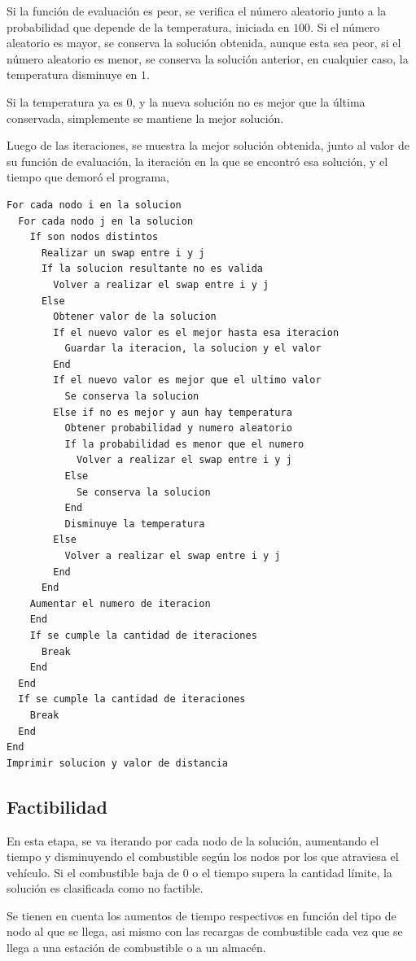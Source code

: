 \documentclass[letter, 10pt]{article}
\begin{document}
Si la función de evaluación es peor, se verifica el número aleatorio junto a la probabilidad que depende de la temperatura, iniciada en $100$. Si el número aleatorio es mayor, se conserva la solución obtenida, aunque esta sea peor, si el número aleatorio es menor, se conserva la solución anterior, en cualquier caso, la temperatura disminuye en $1$.

Si la temperatura ya es $0$, y la nueva solución no es mejor que la última conservada, simplemente se mantiene la mejor solución. 

Luego de las iteraciones, se muestra la mejor solución obtenida, junto al valor de su función de evaluación, la iteración en la que se encontró esa solución, y el tiempo que demoró el programa, 

\newpage
\begin{lstlisting}[frame = single]
For cada nodo i en la solucion
  For cada nodo j en la solucion
    If son nodos distintos
      Realizar un swap entre i y j
      If la solucion resultante no es valida
        Volver a realizar el swap entre i y j
      Else
        Obtener valor de la solucion
        If el nuevo valor es el mejor hasta esa iteracion
          Guardar la iteracion, la solucion y el valor
        End
        If el nuevo valor es mejor que el ultimo valor
          Se conserva la solucion
        Else if no es mejor y aun hay temperatura
          Obtener probabilidad y numero aleatorio
          If la probabilidad es menor que el numero
            Volver a realizar el swap entre i y j
          Else
            Se conserva la solucion
          End  
          Disminuye la temperatura
        Else
          Volver a realizar el swap entre i y j
        End
      End
    Aumentar el numero de iteracion
    End
    If se cumple la cantidad de iteraciones
      Break
    End
  End
  If se cumple la cantidad de iteraciones
    Break
  End
End
Imprimir solucion y valor de distancia
\end{lstlisting}

\newpage
\subsection{Factibilidad}
En esta etapa, se va iterando por cada nodo de la solución, aumentando el tiempo y disminuyendo el combustible según los nodos por los que atraviesa el vehículo. Si el combustible baja de $0$ o el tiempo supera la cantidad límite, la solución es clasificada como no factible.

Se tienen en cuenta los aumentos de tiempo respectivos en función del tipo de nodo al que se llega, asi mismo con las recargas de combustible cada vez que se llega a una estación de combustible o a un almacén.
\end{document}
